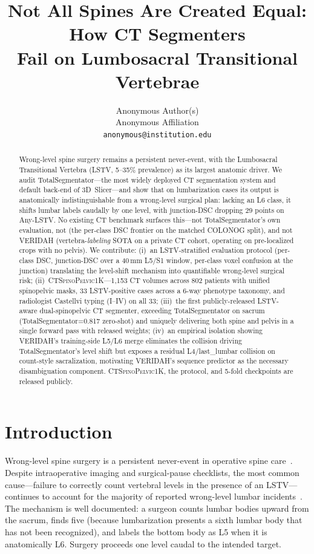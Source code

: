 \documentclass{article}
\title{Not All Spines Are Created Equal: How CT Segmenters\\
Fail on Lumbosacral Transitional Vertebrae}
\author{%
  Anonymous Author(s) \\
  Anonymous Affiliation \\
  \texttt{anonymous@institution.edu}
}
\newcommand{\dataset}{\textsc{CTSpinoPelvic1K}}
\newcommand{\TS}{TotalSegmentator}
\newcommand{\VERIDAH}{VERIDAH}
\begin{document}
\maketitle

\begin{abstract}
Wrong-level spine surgery remains a persistent
never-event, with the Lumbosacral Transitional Vertebra
(LSTV, 5--35\% prevalence) as its largest anatomic
driver. We audit \TS{}---the most widely deployed CT
segmentation system and default back-end of
3D~Slicer---and show that on lumbarization cases its
output is anatomically indistinguishable from a
wrong-level surgical plan: lacking an L6 class, it
shifts lumbar labels caudally by one level, with
junction-DSC dropping 29 points on Any-LSTV. No
existing CT benchmark surfaces this---not \TS{}'s own
evaluation, not \citet{Li2025LumbarMechanism} (the
per-class DSC frontier on the matched COLONOG split),
and not \VERIDAH{} (vertebra-\emph{labeling} SOTA on a
private CT cohort, operating on pre-localized crops
with no pelvis). We
contribute: (i)~an LSTV-stratified evaluation protocol
(per-class DSC, junction-DSC over a 40\,mm L5/S1
window, per-class voxel confusion at the junction)
translating the level-shift mechanism into quantifiable
wrong-level surgical risk;
(ii)~\dataset{}---1{,}153 CT volumes across 802
patients with unified spinopelvic masks, 33
LSTV-positive cases across a 6-way phenotype taxonomy,
and radiologist Castellvi typing (I--IV) on
all 33; (iii)~the first publicly-released LSTV-aware
dual-spinopelvic CT segmenter, exceeding \TS{} on
sacrum (\TS{}=0.817 zero-shot) and uniquely delivering
both spine and pelvis in a single forward pass with
released weights; (iv)~an empirical isolation showing
\VERIDAH{}'s training-side L5/L6 merge eliminates the
collision driving \TS{}'s level shift but exposes a
residual L4/last\_lumbar collision on count-style
sacralization, motivating \VERIDAH{}'s sequence
predictor as the necessary disambiguation component.
\dataset{}, the protocol, and 5-fold checkpoints are
released publicly.
\end{abstract}

\section{Introduction}
\label{sec:intro}

Wrong-level spine surgery is a persistent never-event in
operative spine
care~\citep{Konin2010LumbosacralRelevance}. Despite
intraoperative imaging and surgical-pause checklists, the
most common cause---failure to correctly count vertebral
levels in the presence of an LSTV---continues to account for
the majority of reported wrong-level lumbar
incidents~\citep{Carrino2011EffectImaging}. The mechanism is
well documented: a surgeon counts lumbar bodies upward from
the sacrum, finds five (because lumbarization presents a
sixth lumbar body that has not been recognized), and labels
the bottom body as L5 when it is anatomically L6. Surgery
proceeds one level caudal to the intended target.
\end{document}
